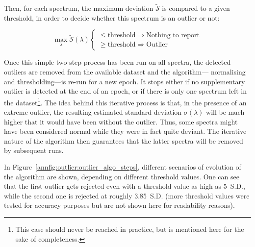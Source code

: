 Then, for each spectrum, the maximum deviation $\widetilde{\mathcal{S}}$ is compared to a given threshold, in order to decide whether this spectrum is an outlier or not:

\begin{equation}
	\max_{\lambda} \widetilde{\mathcal{S}}(\lambda)
	\begin{cases}
		\leq \text{threshold} \Longrightarrow \text{Nothing to report} \\
		\geq \text{threshold} \Longrightarrow \text{Outlier}
	\end{cases}
\end{equation}

Once this simple two-step process has been run on all spectra, the detected outliers are removed from the available dataset and the algorithm---\ie{} normalising and thresholding---is re-run for a new epoch. It stops either if no supplementary outlier is detected at the end of an epoch, or if there is only one spectrum left in the dataset\footnote{This case should never be reached in practice, but is mentioned here for the sake of completeness.}. The idea behind this iterative process is that, in the presence of an extreme outlier, the resulting estimated standard deviation $\sigma(\lambda)$ will be much higher that it would have been without the outlier. Thus, some spectra might have been considered normal while they were in fact quite deviant. The iterative nature of the algorithm then guarantees that the latter spectra will be removed by subsequent runs.

In Figure~\ref{annfig:outlier:outlier_algo_steps}, different scenarios of evolution of the algorithm are shown, depending on different threshold values. One can see that the first outlier gets rejected even with a threshold value as high as 5~S.D., while the second one is rejected at roughly 3.85~S.D. (more threshold values were tested for accuracy purposes but are not shown here for readability reasons).


